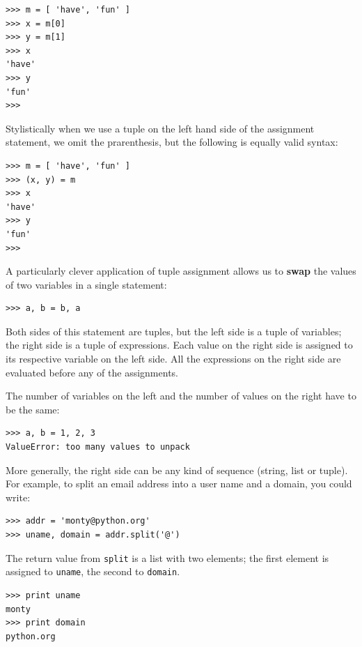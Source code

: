 \documentclass[10pt]{book}
\begin{document}
\beforeverb
\begin{verbatim}
>>> m = [ 'have', 'fun' ]
>>> x = m[0]
>>> y = m[1]
>>> x
'have'
>>> y
'fun'
>>> 
\end{verbatim}
\afterverb

Stylistically when we use a tuple on the left hand side of the assignment
statement, we omit the prarenthesis, but the following is equally 
valid syntax:

\beforeverb
\begin{verbatim}
>>> m = [ 'have', 'fun' ]
>>> (x, y) = m
>>> x
'have'
>>> y
'fun'
>>> 
\end{verbatim}
\afterverb
%
A particularly clever application of tuple assignment allows
us to {\bf swap} the values of two variables in a single statement:

\beforeverb
\begin{verbatim}
>>> a, b = b, a
\end{verbatim}
\afterverb
%
Both sides of this statement are tuples, but
the left side is a tuple of variables; the right side is a tuple of
expressions.  Each value on the right side 
is assigned to its respective variable on the left side.  
All the expressions on the right side are evaluated before any
of the assignments.

The number of variables on the left and the number of
values on the right have to be the same:


\beforeverb
\begin{verbatim}
>>> a, b = 1, 2, 3
ValueError: too many values to unpack
\end{verbatim}
\afterverb
%
More generally, the right side can be any kind of sequence
(string, list or tuple).  For example, to split an email address
into a user name and a domain, you could write:


\beforeverb
\begin{verbatim}
>>> addr = 'monty@python.org'
>>> uname, domain = addr.split('@')
\end{verbatim}
\afterverb
%
The return value from {\tt split} is a list with two elements;
the first element is assigned to {\tt uname}, the second to
{\tt domain}.

\beforeverb
\begin{verbatim}
>>> print uname
monty
>>> print domain
python.org
\end{verbatim}
\afterverb
%
\end{document}
